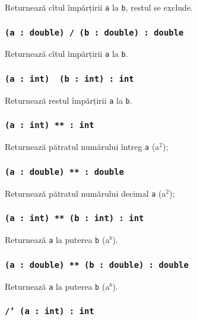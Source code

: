Returnează cîtul împărțirii \texttt{a} la \texttt{b}, restul se exclude.

\subsubsection{\texttt{(a : double) / (b : double) : double}}

Returnează cîtul împărțirii \texttt{a} la \texttt{b}.

\subsubsection{\texttt{(a : int) \ (b : int) : int}}

Returnează restul împărțirii \texttt{a} la \texttt{b}.


\subsubsection{\texttt{(a : int) ** : int}}

Returnează pătratul numărului întreg \texttt{a} (a$^2$);

\subsubsection{\texttt{(a : double) ** : double}}

Returnează pătratul numărului decimal \texttt{a} (a$^2$);

\subsubsection{\texttt{(a : int) ** (b : int) : int}}

Returnează \texttt{a} la puterea \texttt{b} (a$^b$).

\subsubsection{\texttt{(a : double) ** (b : double) : double}}

Returnează \texttt{a} la puterea \texttt{b} (a$^b$).

\subsubsection{\texttt{/' (a : int) : int}}

